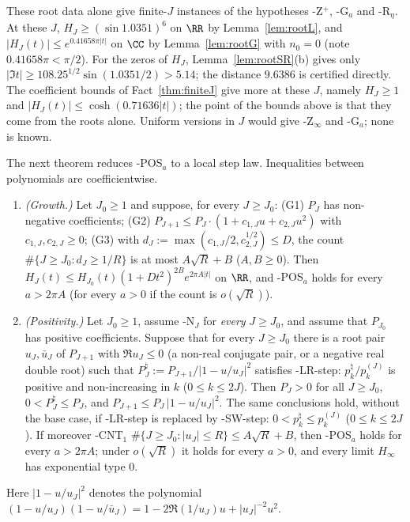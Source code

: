 These root data alone give finite-$J$ instances of the hypotheses \hyp{Z$^+$}, \hyp{G$_a$} and \hyp{R$_\eta$}. At these $J$,
$H_J\ge(\sin1.0351)^{6}$ on $\RR$ by Lemma~\ref{lem:rootL}, and $\lvert H_J(t)\rvert\le e^{0.41658\pi\lvert t\rvert}$ on $\CC$ by Lemma~\ref{lem:rootG}
with $n_0=0$ (note $0.41658\pi<\pi/2$). For the zeros of $H_J$, Lemma~\ref{lem:rootSR}(b) gives only
$\lvert\Im t\rvert\ge108.25^{1/2}\sin(1.0351/2)>5.14$; the distance $9.6386$ is certified directly. The coefficient bounds of
Fact~\ref{thm:finiteJ} give more at these $J$, namely $H_J\ge1$ and $\lvert H_J(t)\rvert\le\cosh(0.71636\lvert t\rvert)$; the point of the bounds
above is that they come from the roots alone. Uniform versions in $J$ would give \hyp{Z$_\infty$} and \hyp{G$_a$}; none is known.

The next theorem reduces \hyp{POS$_a$} to a local step law. Inequalities between polynomials are coefficientwise.

\begin{theorem}\label{thm:IG}
\begin{enumerate}[label=(\alph*),leftmargin=2em]
\item \emph{(Growth.)} Let $J_0\ge1$ and suppose, for every $J\ge J_0$:
(G1) $P_J$ has non-negative coefficients;
(G2) $P_{J+1}\le P_J\cdot(1+c_{1,J}u+c_{2,J}u^2)$ with $c_{1,J},c_{2,J}\ge0$;
(G3) with $d_J:=\max(c_{1,J}/2,c_{2,J}^{1/2})\le D$, the count $\#\{J\ge J_0:d_J\ge1/R\}$ is at most $A\sqrt R+B$
($A,B\ge0$). Then $H_J(t)\le H_{J_0}(t)(1+Dt^2)^{2B}e^{2\pi A\lvert t\rvert}$ on $\RR$, and \hyp{POS$_a$} holds for every
$a>2\pi A$ (for every $a>0$ if the count is $o(\sqrt R)$).
\item \emph{(Positivity.)} Let $J_0\ge1$, assume \hyp{N}$_J$ for \emph{every} $J\ge J_0$, and assume that $P_{J_0}$ has
positive coefficients. Suppose that for every $J\ge J_0$ there is a root pair $u_J,\bar u_J$ of $P_{J+1}$ with
$\Re u_J\le0$ (a non-real conjugate pair, or a negative real double root) such that
$P^\natural_J:=P_{J+1}/\lvert1-u/u_J\rvert^2$ satisfies \hyp{LR-step}: $p^\natural_k/p^{(J)}_k$ is positive and
non-increasing in $k$ ($0\le k\le2J$). Then $P_J>0$ for all $J\ge J_0$, $0<P^\natural_J\le P_J$, and
$P_{J+1}\le P_J\,\lvert1-u/u_J\rvert^2$. The same conclusions hold, without the base case, if \hyp{LR-step} is
replaced by \hyp{SW-step}: $0<p^\natural_k\le p^{(J)}_k$ ($0\le k\le2J$). If moreover
\hyp{CNT$_1$} $\#\{J\ge J_0:\lvert u_J\rvert\le R\}\le A\sqrt R+B$, then \hyp{POS$_a$} holds for every $a>2\pi A$; under
$o(\sqrt R)$ it holds for every $a>0$, and every limit $H_\infty$ has exponential type $0$.
\end{enumerate}
Here $\lvert1-u/u_J\rvert^2$ denotes the polynomial $(1-u/u_J)(1-u/\bar u_J)=1-2\Re(1/u_J)u+\lvert u_J\rvert^{-2}u^2$.
\end{theorem}


